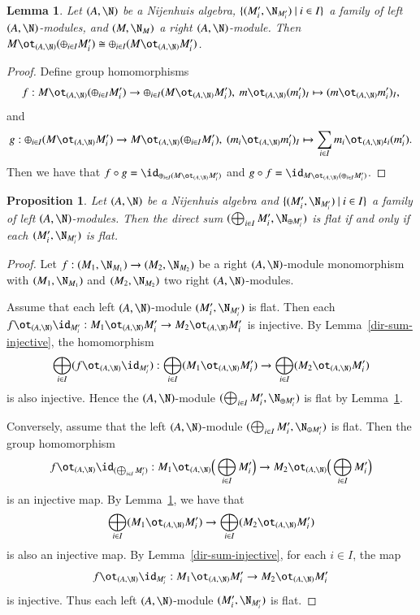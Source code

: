 \documentclass[12pt]{amsart}
\newtheorem{lemma}[theorem]{Lemma}
\newtheorem{prop}[theorem]{Proposition}
\theoremstyle{definition}
\begin{document}
\begin{lemma}\label{dir-otim-iso}
Let $(A, \N)$ be a Nijenhuis algebra, $ \{(M'_{i},\N_{M'_i})~|~i \in I \}$ a family of left $(A, \N)$-modules, and $(M, \N_{M})$ a right $(A, \N)$-module. Then $M \ot_{(A, \N)}(\oplus_{i\in I}M'_{i})\cong \oplus_{i\in I}(M \ot_{(A, \N) }M'_{i})$.
\end{lemma}
\begin{proof}
Define group homomorphisms
\begin{eqnarray*}
f: M \ot_{(A,\N)}(\oplus_{i\in I}M'_{i}) \to \oplus_{i\in I}(M \ot_{(A,\N)} M'_{i}), \
m \ot_{(A,\N)} (m'_{i})_{I} \mapsto (m \ot_{(A,\N)} m'_{i})_{I},
\end{eqnarray*}
and
\begin{eqnarray*}
g: \oplus_{i\in I}(M \ot_{(A,\N)} M'_{i}) \to M \ot_{(A,\N)}(\oplus_{i\in I}M'_{i}), \
(m_{i}\ot_{(A,\N)} m'_{i})_{I} \mapsto \sum_{i \in I} m_{i} \ot_{(A,\N)} \iota_i(m'_{i}).
\end{eqnarray*}
Then we have that $f\circ g=\id_{\oplus_{i\in I}(M \ot_{(A,\N)} M'_{i})}$ and $g\circ f=\id_{M \ot_{(A,\N)}(\oplus_{i\in I} M'_{i})}$. 
\end{proof}

\begin{prop}\label{dir-sum-flat}
Let $(A,\N)$ be a Nijenhuis algebra and $\{(M'_{i},\N_{M'_i})~|~i \in I \}$  a family of left $(A,\N)$-modules. Then the direct sum $(\bigoplus_{i\in I} M'_{i}, \N_{\oplus M'_i})$ is flat if and only if each $(M'_{i},\N_{M'_i})$ is flat.
\end{prop}
\begin{proof}
Let $f: (M_1, \N_{M_1}) \to (M_2, \N_{M_2})$ be a right $(A,\N)$-module monomorphism with $(M_1,\N_{M_1})$ and $(M_2, \N_{M_2})$  two right $(A,\N)$-modules.

Assume that each left $(A,\N)$-module $(M'_{i},\N_{M'_i})$ is flat. Then each $f \ot_{(A,\N)} \id_{M'_{i}}: M_1 \ot_{(A,\N)} M'_{i} \to M_2 \ot_{(A,\N)} M'_{i}$
is injective. By Lemma~\ref{dir-sum-injective}, the homomorphism
$$\bigoplus_{i\in I}(f \ot_{(A,\N)} \id_{M'_{i}}): \bigoplus_{i\in I}(M_1 \ot_{(A,\N)} M'_{i}) \to \bigoplus_{i\in I}(M_2 \ot_{(A,\N)} M'_{i})$$
is also injective. Hence the $(A, \N)$-module $(\bigoplus_{i\in I} M'_{i},  \N_{\oplus M'_i})$ is flat by Lemma~\ref{dir-otim-iso}.

Conversely, assume that the left $(A,\N)$-module $(\bigoplus_{i\in I} M'_{i},\N_{\oplus M'_i})$ is flat. Then the group homomorphism
$$f \ot_{(A,\N)} \id_{(\bigoplus_{i\in I} M'_{i})}: M_1 \ot_{(A,\N)} \Big(\bigoplus_{i\in I} M'_{i}\Big) \to M_2 \ot_{(A,\N)} \Big(\bigoplus_{i\in I} M'_{i}\Big)$$
is an injective map. By Lemma~\ref{dir-otim-iso}, we have that
$$\bigoplus_{i\in I}(M_1 \ot_{(A,\N)} M'_{i}) \to \bigoplus_{i\in I}( M_2 \ot_{(A,\N)} M'_{i})$$
is also an injective map. By Lemma~\ref{dir-sum-injective}, for each $i\in I$, the map
$$
f \ot_{(A,\N)} \id_{M'_{i}}:  M_1 \ot_{(A,\N)} M'_{i} \to M_2 \ot_{(A,\N)} M'_{i}
$$
is injective. Thus each left $(A,\N)$-module $(M'_{i},\N_{M'_i})$ is flat.
\end{proof}
\end{document}
